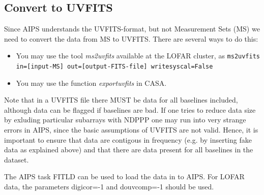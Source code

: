 \documentclass[graybox]{svmult}
\begin{document}


\subsection{Convert to UVFITS}

Since AIPS understands the UVFITS-format, but not Measurement Sets (MS)
we need to convert the data from MS to UVFITS. There are several ways to do this:
\begin{itemize}
\item You may use the tool \emph{ms2uvfits} available at the LOFAR cluster, as {\tt ms2uvfits in=[input-MS] out=[output-FITS-file] writesyscal=False}
\item You may use the function \emph{exportuvfits} in CASA.
\end{itemize}
Note that in a UVFITS file there MUST be data for all baselines included,
although data can be flagged if baselines are bad. If one tries to reduce data
size by exluding particular subarrays with NDPPP one may run into very strange
errors in AIPS, since the basic assumptions of UVFITS are not valid.  Hence, it
is important to ensure that data are contigous in frequency (e.g. by inserting
fake data as explained above) and that there are data present for all baselines
in the dataset. 

The AIPS task FITLD can be used to load the data in to AIPS. For LOFAR data,
the parameters digicor=-1 and douvcomp=-1 should be used.
\end{document}
